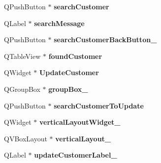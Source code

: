 \begin{DoxyCompactItemize}
\item 
\mbox{\label{class_ui___main_window_a10e060af9582abab227c07cc53ff5649}} 
Q\+Push\+Button $\ast$ {\bfseries search\+Customer}
\item 
\mbox{\label{class_ui___main_window_ae17975d299ee8e068f31c925d265a811}} 
Q\+Label $\ast$ {\bfseries search\+Message}
\item 
\mbox{\label{class_ui___main_window_af71d593674c287382624ed98ca572c63}} 
Q\+Push\+Button $\ast$ {\bfseries search\+Customer\+Back\+Button\+\_}
\item 
\mbox{\label{class_ui___main_window_a1d388e30db212be00e0063731ee64c2b}} 
Q\+Table\+View $\ast$ {\bfseries found\+Customer}
\item 
\mbox{\label{class_ui___main_window_afa711e310621dd27692b6747ccfb72a0}} 
Q\+Widget $\ast$ {\bfseries Update\+Customer}
\item 
\mbox{\label{class_ui___main_window_a320d3d7ba1cb8fff7b7b95923ed10f5e}} 
Q\+Group\+Box $\ast$ {\bfseries group\+Box\+\_}
\item 
\mbox{\label{class_ui___main_window_a1edd82e49c1b4b0153606ef630ececf0}} 
Q\+Push\+Button $\ast$ {\bfseries search\+Customer\+To\+Update}
\item 
\mbox{\label{class_ui___main_window_acfaf6d66c957965550714c6b9bd0edc0}} 
Q\+Widget $\ast$ {\bfseries vertical\+Layout\+Widget\+\_}
\item 
\mbox{\label{class_ui___main_window_a38b8a4b887f3b58e2a49e7905ae6f1f0}} 
Q\+V\+Box\+Layout $\ast$ {\bfseries vertical\+Layout\+\_}
\item 
\mbox{\label{class_ui___main_window_a82f0ffd8f1bead4614d8511e89b0b9d5}} 
Q\+Label $\ast$ {\bfseries update\+Customer\+Label\+\_}
\item 
\mbox{\label{class_ui___main_window_a85eab231ee087659c54c83fdb8002055}} 

\end{DoxyCompactItemize}
